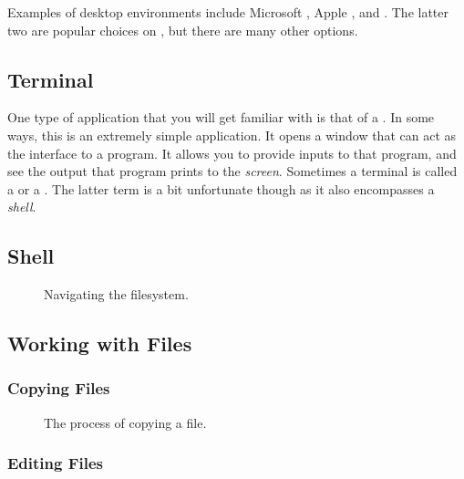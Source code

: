 Examples of desktop environments include Microsoft , Apple ,  and . The latter two are popular choices on , but there are many other options.

\subsection{Terminal}

One type of application that you will get familiar with is that of a . In some ways, this is an extremely simple application. It opens a window that can act as the interface to a  program. It allows you to provide inputs to that program, and see the output that program prints to the \textsl{screen}. Sometimes a terminal is called a  or a . The latter term is a bit unfortunate though as it also encompasses a \textsl{shell}.

\subsection{Shell}

\begin{figure}[tbp]
  
  \caption{Navigating the filesystem.}
  \label{fig:bg:processes:navigation}
\end{figure}

\subsection{Working with Files}

\subsubsection{Copying Files}



\begin{figure}[tbp]
  
  \caption{The process of copying a file.}
  \label{fig:bg:processes:copy}
\end{figure}

\subsubsection{Editing Files}

